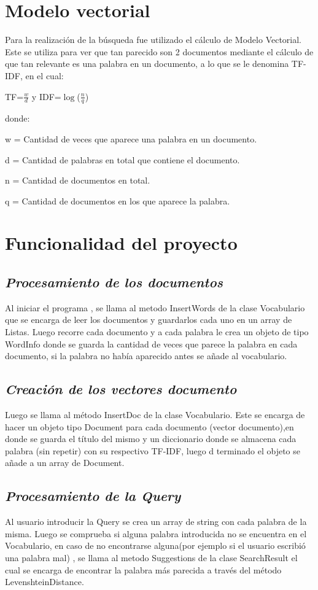 \documentclass[12pt]{article}
\begin{document}
	\section{\Huge{Modelo vectorial}}
	Para la realización de la búsqueda fue utilizado el cálculo de Modelo Vectorial. Este se utiliza
	para ver que tan parecido son 2 documentos mediante el cálculo de que tan relevante es una
	palabra en un documento, a lo que se le denomina TF-IDF, en el cual:
	
	TF=$\frac{w}{d}$  y IDF=$\log$($\frac{n}{q}$)
	
	donde:
	
	w = Cantidad de veces que aparece una palabra en un documento.
	
	d = Cantidad de palabras en total que contiene el documento.
	
	n = Cantidad de documentos en total. 
	
	q = Cantidad de documentos en los que aparece la palabra.
	
	
	
	\section{\Huge{Funcionalidad del proyecto} }
	\subsection{\textit{Procesamiento de los documentos}}
	Al iniciar el programa , se llama al metodo InsertWords de la clase Vocabulario que se encarga
	de leer los documentos y guardarlos cada uno en un array de Listas. Luego recorre cada
	documento y a cada palabra le crea un objeto de tipo WordInfo donde se guarda la cantidad de
	veces que parece la palabra en cada documento, si la palabra no había aparecido antes se añade
	al vocabulario.
	\subsection{\textit{Creación de los vectores documento}}
	Luego se llama al método InsertDoc de la clase Vocabulario. Este se encarga de hacer un objeto
	tipo Document para cada documento (vector documento),en donde se guarda el título del mismo
	y un diccionario donde se almacena cada palabra (sin repetir) con su respectivo TF-IDF, luego d
	terminado el objeto se añade a un array de Document.
	\subsection{\textit{Procesamiento de la Query}}
	Al usuario introducir la Query se crea un array de string con cada palabra de la misma. Luego se
	comprueba si alguna palabra introducida no se encuentra en el Vocabulario, en caso de no
	encontrarse alguna(por ejemplo si el usuario escribió una palabra mal) , se llama al metodo
	Suggestions de la clase SearchResult el cual se encarga de encontrar la palabra más parecida a
	través del método  LevenshteinDistance.
	
\end{document}
